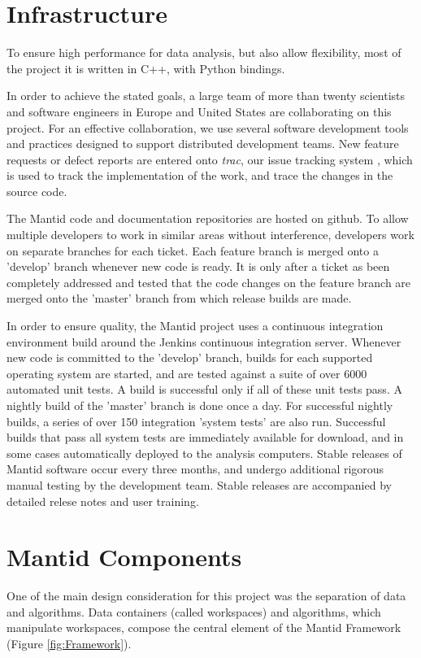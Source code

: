 \documentclass{elsarticle}
\begin{document}
\section{Infrastructure}
\label{infrastructure}
To ensure high performance for data analysis, but also allow flexibility, most of the project it is written in C++, with Python bindings.
 
In order to achieve the stated goals, a large team of more than twenty scientists and software engineers in Europe and United States are collaborating on this project. For an effective collaboration, we use several software development tools and practices designed to support distributed development teams. New feature requests or defect reports are entered onto \textit{trac}, our issue tracking system \cite{trac}, which is used to track the implementation of the work, and trace the changes in the source code.
 
The Mantid code and documentation repositories are hosted on github\cite{github}. To allow multiple developers to work in similar areas without interference, developers work on separate branches for each ticket. Each feature branch is merged onto a 'develop' branch whenever new code is ready.
It is only after a ticket as been completely addressed and tested that the code changes on the feature branch are merged onto the 'master' branch from which release builds are made.

In order to ensure quality, the Mantid project uses a continuous integration environment build around the Jenkins continuous integration server\cite{jenkins}. Whenever new code is committed to the 'develop' branch, builds for each supported operating system are started, and are tested against a suite of over 6000 automated unit tests. A build is successful only if all of these unit tests pass. A nightly build of the 'master' branch is done once a day. For successful nightly builds, a series of over 150 integration 'system tests' are also run. Successful builds that pass all system tests are immediately available for download, and in some cases automatically deployed to the analysis computers. Stable releases of Mantid software occur every three months, and undergo additional rigorous manual testing by the development team. Stable releases are accompanied by detailed relese notes and user training. 



\section{Mantid Components}
One of the main design consideration for this project was the separation of data and algorithms. Data containers (called workspaces) and algorithms, which manipulate workspaces, compose the central element of the Mantid Framework (Figure \ref{fig:Framework}). 
\end{document}
